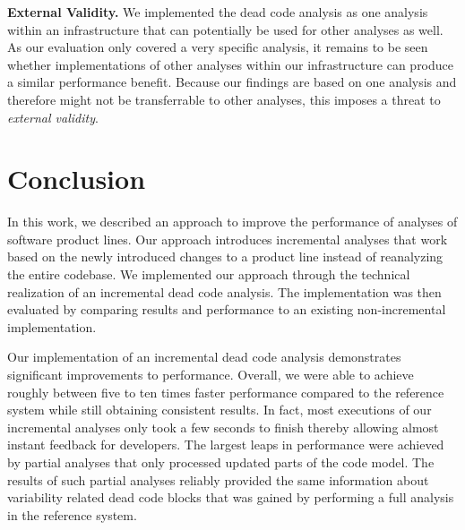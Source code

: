 \documentclass[a4paper]{article}
\begin{document}
\textbf{External Validity.} We implemented the dead code analysis as one analysis within an infrastructure that can potentially be used for other analyses as well. As our evaluation only covered a very specific analysis, it remains to be seen whether implementations of other analyses within our infrastructure can produce a similar performance benefit. Because our findings are based on one analysis and therefore might not be transferrable to other analyses, this imposes a threat to \emph{external validity}.


\clearpage
\newpage
\section{Conclusion}\label{conclusion}

In this work, we described an approach to improve the performance of analyses of software product lines. Our approach introduces incremental analyses that work based on the newly introduced changes to a product line instead of reanalyzing the entire codebase. We implemented our approach through the technical realization of an incremental dead code analysis. The implementation was then evaluated by comparing results and performance to an existing non-incremental implementation.

Our implementation of an incremental dead code analysis demonstrates significant improvements to performance. Overall, we were able to achieve roughly between five to ten times faster performance compared to the reference system while still obtaining consistent results. 
In fact, most executions of our incremental analyses only took a few seconds to finish thereby allowing   almost instant feedback for developers. The largest leaps in performance were achieved by partial analyses that only processed updated parts of the code model. The results of such partial analyses reliably provided the same information about variability related dead code blocks that was gained by performing a full analysis in the reference system. 
\end{document}
